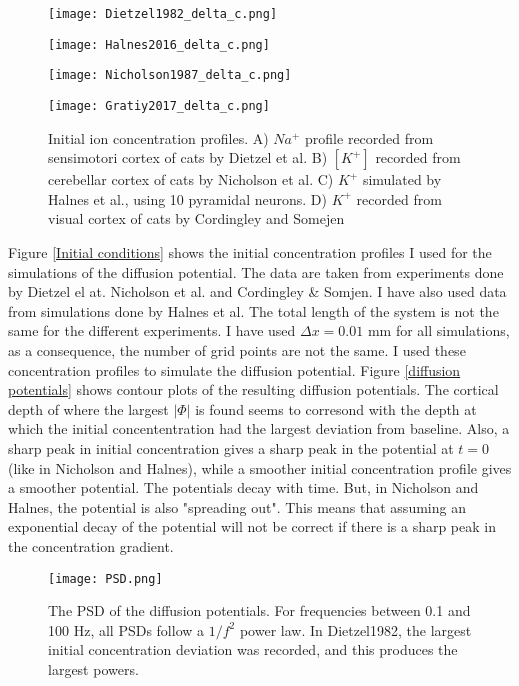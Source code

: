 \documentclass{article}
\begin{document}
\begin{figure}[!tbp]
  \centering
  \begin{minipage}[b]{0.45\textwidth}
    \texttt{[image: Dietzel1982\_delta\_c.png]}
  \end{minipage}
  \hfill
  \begin{minipage}[b]{0.45\textwidth}
    \texttt{[image: Halnes2016\_delta\_c.png]}
  \end{minipage}
    \begin{minipage}[b]{0.45\textwidth}
    \texttt{[image: Nicholson1987\_delta\_c.png]}
  \end{minipage}
  \hfill
  \begin{minipage}[b]{0.45\textwidth}
    \texttt{[image: Gratiy2017\_delta\_c.png]}
  \end{minipage}
  \caption{Initial ion concentration profiles. A) $Na^+$ profile recorded from sensimotori cortex of cats by Dietzel et al. B) $[K^+]$  recorded from cerebellar cortex of cats by Nicholson et al. C)  $K^+$ simulated by Halnes et al., using 10 pyramidal neurons. D) $K^+$ recorded from visual cortex of cats by Cordingley and Somejen }
  \label{fig:initial concentrations}
\end{figure} 

 Figure \ref{Initial conditions} shows the initial concentration profiles I used for the simulations of the diffusion potential. The data are taken from experiments done by Dietzel el at. Nicholson et al. and Cordingley \& Somjen. I have also used data from simulations done by Halnes et al. The total length of the system is not the same for the different experiments. I have used $\Delta x = 0.01$ mm for all simulations, as a consequence, the number of grid points are not the same. I used these concentration profiles to simulate the diffusion potential. Figure \ref{diffusion potentials} shows contour plots of the resulting diffusion potentials. The cortical depth of where the largest $|\Phi|$ is found seems to corresond with the depth at which the initial concententration had the largest deviation from baseline. Also, a sharp peak in initial concentration gives a sharp peak in the potential at $t=0$ (like in Nicholson and Halnes), while a smoother initial concentration profile gives a smoother potential. The potentials decay with time. But, in Nicholson and Halnes, the potential is also "spreading out". This means that assuming an exponential decay of the potential will not be correct if there is a sharp peak in the concentration gradient. 
\begin{figure}
  \texttt{[image: PSD.png]}
  \caption{The PSD of the diffusion potentials. For frequencies between 0.1 and 100 Hz, all PSDs follow a $1/f^2$ power law. In Dietzel1982, the largest initial concentration deviation was recorded, and this produces the largest powers.}
  \label{fig:PSD}
\end{figure}
\end{document}
